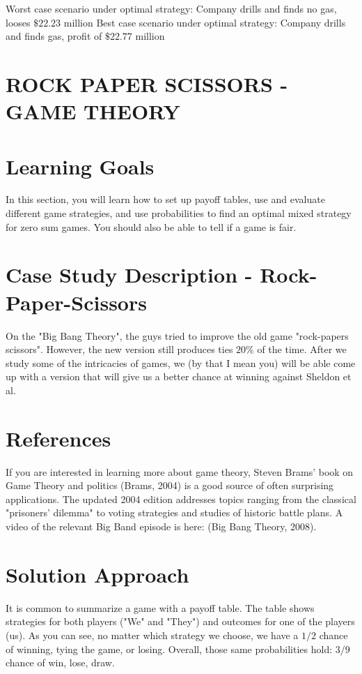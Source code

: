 \documentclass[10pt]{article}
\begin{document}
Worst case scenario under optimal strategy: Company drills and finds no gas, looses $\$ 22.23$ million Best case scenario under optimal strategy: Company drills and finds gas, profit of $\$ 22.77$ million

\section{ROCK PAPER SCISSORS - GAME THEORY}
\section{Learning Goals}
In this section, you will learn how to set up payoff tables, use and evaluate different game strategies, and use probabilities to find an optimal mixed strategy for zero sum games. You should also be able to tell if a game is fair.

\section{Case Study Description - Rock-Paper-Scissors}
On the "Big Bang Theory", the guys tried to improve the old game "rock-papers scissors". However, the new version still produces ties $20 \%$ of the time. After we study some of the intricacies of games, we (by that I mean you) will be able come up with a version that will give us a better chance at winning against Sheldon et al.

\section{References}
If you are interested in learning more about game theory, Steven Brams' book on Game Theory and politics (Brams, 2004) is a good source of often surprising applications. The updated 2004 edition addresses topics ranging from the classical "prisoners' dilemma" to voting strategies and studies of historic battle plans. A video of the relevant Big Band episode is here: (Big Bang Theory, 2008).

\section{Solution Approach}
It is common to summarize a game with a payoff table. The table shows strategies for both players ("We" and "They") and outcomes for one of the players (us). As you can see, no matter which strategy we choose, we have a $1 / 2$ chance of winning, tying the game, or losing. Overall, those same probabilities hold: $3 / 9$ chance of win, lose, draw.
\end{document}
